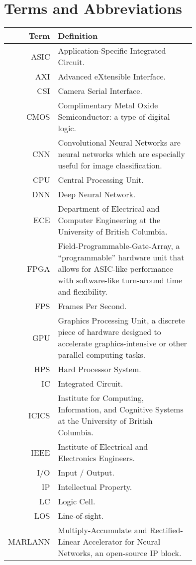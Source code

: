 \section*{Terms and Abbreviations}

\begin{tabular}[h]{rp{0.75\linewidth}}
    \hline
    \textbf{Term} & \textbf{Definition}\\
    \hline

    ASIC & Application-Specific Integrated Circuit.\\
    AXI & Advanced eXtensible Interface. \\
    CSI & Camera Serial Interface. \\
    CMOS & Complimentary Metal Oxide Semiconductor: a type of digital logic. \\
    CNN & Convolutional Neural Networks are neural networks which are especially useful for image classification.\cite{cnn} \\
    CPU & Central Processing Unit. \\
    DNN & Deep Neural Network. \\
    ECE & Department of Electrical and Computer Engineering at the University of British Columbia.\\
    FPGA & Field-Programmable-Gate-Array, a ``programmable'' hardware unit that allows for ASIC-like performance with software-like turn-around time and flexibility.\\
    FPS & Frames Per Second.\\
    GPU & Graphics Processing Unit, a discrete piece of hardware designed to accelerate graphics-intensive or other parallel computing tasks.\\
    HPS & Hard Processor System. \\
    IC & Integrated Circuit. \\
	ICICS & Institute for Computing, Information, and Cognitive Systems at the University of British Columbia.\\
    IEEE & Institute of Electrical and Electronics Engineers. \\
    I/O & Input / Output. \\
    IP & Intellectual Property. \\
    LC & Logic Cell. \\
    LOS & Line-of-sight.\\
    MARLANN & Multiply-Accumulate and Rectified-Linear Accelerator for Neural Networks, an open-source IP block. \\

\end{tabular}
